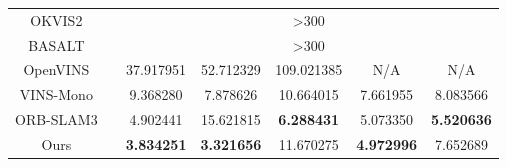 \begin{table}[]
\begin{tabular}{c|c|ccccc}
  OKVIS2          &                         & \multicolumn{5}{c}{\textgreater{}300}                         \\
  BASALT          &                         & \multicolumn{5}{c}{\textgreater{}300}                         \\
  OpenVINS        &                         & 37.917951                                & 52.712329                                & 109.021385                               & N/A                                      & N/A                                      \\
  VINS-Mono       &                         & 9.368280                                 & 7.878626                                 & 10.664015                                & 7.661955                                 & 8.083566                                 \\
  ORB-SLAM3       &                         & 4.902441                                 & 15.621815                                & \cellcolor[HTML]{FA7F6F}\textbf{6.288431}                                 & 5.073350                                 & \cellcolor[HTML]{FA7F6F}\textbf{5.520636}                                 \\
  Ours            &                         & \cellcolor[HTML]{FA7F6F}\textbf{3.834251}                                 & \cellcolor[HTML]{FA7F6F}\textbf{3.321656}                                 & 11.670275                                & \cellcolor[HTML]{FA7F6F}\textbf{4.972996}                                 & 7.652689                                 \\ \bottomrule
  \end{tabular}
  \end{table}

